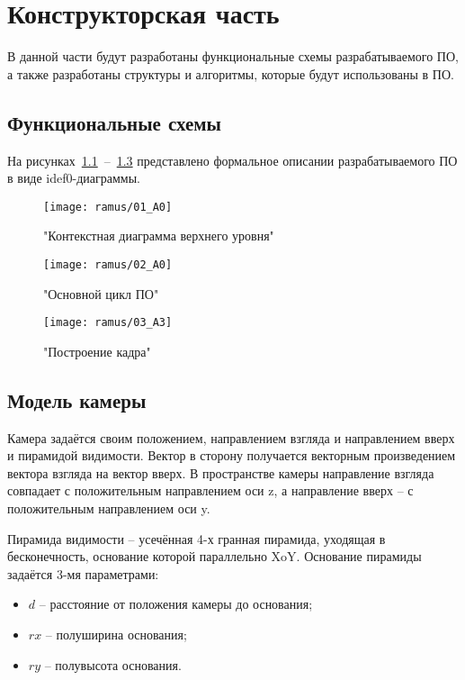 \chapter{Конструкторская часть}

В данной части будут разработаны функциональные схемы разрабатываемого ПО, а также разработаны структуры и алгоритмы, которые будут использованы в ПО.

\section{Функциональные схемы} 

На рисунках~\ref{fig:A0}~--~\ref{fig:A3} представлено формальное описании разрабатываемого ПО в виде idef0-диаграммы.

\begin{figure}[H]
	\centering
	\texttt{[image: ramus/01\_A0]}
	\caption{"Контекстная диаграмма верхнего уровня"}
	\label{fig:A0}
\end{figure}

\begin{figure}[H]
	\centering
	\texttt{[image: ramus/02\_A0]}
	\caption{"Основной цикл ПО"}
	\label{fig:A1}
\end{figure}

\begin{figure}[H]
	\centering
	\texttt{[image: ramus/03\_A3]}
	\caption{"Построение кадра"}
	\label{fig:A3}
\end{figure}

\section{Модель камеры}

Камера задаётся своим положением, направлением взгляда и направлением вверх и пирамидой видимости. Вектор в сторону получается векторным произведением вектора взгляда на вектор вверх. В пространстве камеры направление взгляда совпадает с положительным направлением оси z, а направление вверх -- с положительным направлением оси y.

Пирамида видимости -- усечённая 4-х гранная пирамида, уходящая в бесконечность, основание которой параллельно XoY. Основание пирамиды задаётся 3-мя параметрами:

\begin{itemize}
	\item $d$ -- расстояние от положения камеры до основания;
	\item $rx$ -- полуширина основания;
	\item $ry$ -- полувысота основания.
\end{itemize}

